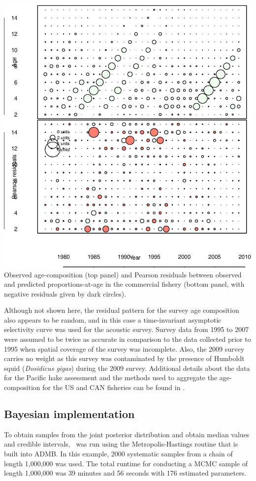\begin{multicols}{2}
\begin{figurehere}
	\centering
	\includegraphics[width=\columnwidth]{iscamFigs/phakefig13a.eps}\\
	\caption{Observed age-composition (top panel) and Pearson residuals between observed and predicted proportions-at-age in the commercial fishery (bottom panel, with negative residuals given by dark circles).}\label{fig13a}
\end{figurehere}

Although not shown here, the residual pattern for the survey age composition also appears to be random, and in this case a time-invariant asymptotic selectivity curve was used for the acoustic survey. Survey data from 1995 to 2007 were assumed to be twice as accurate in comparison to the data collected prior to 1995 when spatial coverage of the survey was incomplete.  Also, the 2009 survey carries no weight as this survey was contaminated by the presence of Humboldt squid (\textit{Dosidicus gigas}) during the 2009 survey.  Additional details about the data for the Pacific hake assessment and the methods used to aggregate the age-composition for the US and CAN fisheries can be found in \cite{Martell2009}.

\subsection{Bayesian implementation}
To obtain samples from the joint posterior distribution and obtain median values and credible intervals, \iscam\ was run using the Metropolis-Hastings routine that is built into ADMB.  In this example, 2000 systematic samples from a chain of length 1,000,000 was used.  The total runtime for conducting a MCMC sample  of length 1,000,000 was 39 minutes and 56 seconds with 176 estimated parameters.


\end{multicols}

